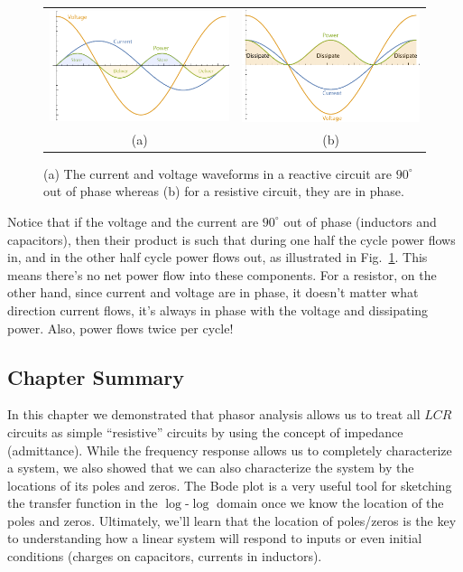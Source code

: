 \begin{figure}[tb]
\begin{center}
\begin{tabular}{cc}
\includegraphics[width=.5\columnwidth]{cap_power} &
\includegraphics[width=.5\columnwidth]{res_power} \\
(a) & (b) \\
\end{tabular}
\end{center}
\caption{(a) The current and voltage waveforms in a reactive circuit are $90^\circ$ out of phase whereas (b) for a resistive circuit, they are in phase.} \label{fig:powerflow}
\end{figure}

Notice that if the voltage and the current are $90^\circ$ out of phase (inductors and capacitors), then their product is such that during one half the cycle power flows in, and in the other half cycle power flows out, as illustrated in Fig.~\ref{fig:powerflow}.  This means there's no net power flow into these components.  For a resistor, on the other hand, since current and voltage are in phase, it doesn't matter what direction current flows, it's always in phase with the voltage and dissipating power.  Also, power flows twice per cycle!



\subsection{Chapter Summary}

In this chapter we demonstrated that phasor analysis allows us to treat all $LCR$ circuits as simple “resistive” circuits by using the concept of impedance (admittance).  While the frequency response allows us to completely characterize a system, we also showed that we can also characterize the system by the locations of its poles and zeros.  The Bode plot is a very useful tool for sketching the transfer function in the $\log$-$\log$ domain once we know the location of the poles and zeros.  Ultimately, we'll learn that the location of poles/zeros is the key to understanding how a linear system will respond to inputs or even initial conditions (charges on capacitors, currents in inductors).
 
 



